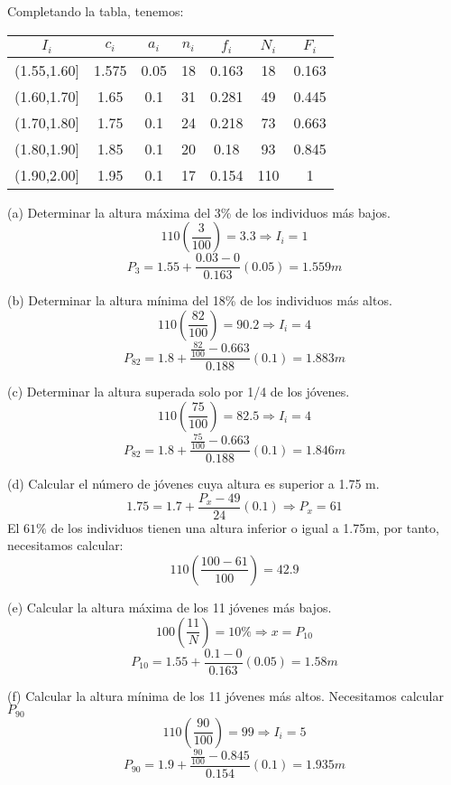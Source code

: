 \documentclass[a4paper,12pt]{article}
\begin{document}
Completando la tabla, tenemos:
\begin{center}
    \begin{tabular}{c|c|c|c|c|c|c}
        $I_i$ & $c_i$ & $a_i$ & $n_i$ & $f_i$ & $N_i$ & $F_i$\\
        \hline
        (1.55,1.60] & 1.575 & 0.05 & 18 & 0.163 & 18 & 0.163 \\
        (1.60,1.70] & 1.65 & 0.1 & 31 & 0.281 & 49 & 0.445\\
        (1.70,1.80] & 1.75 & 0.1 & 24 & 0.218 & 73 & 0.663\\
        (1.80,1.90] & 1.85 & 0.1 & 20 & 0.18 & 93 & 0.845\\
        (1.90,2.00] & 1.95 & 0.1 & 17 & 0.154 & 110 & 1\\
    \end{tabular}
\end{center}

(a) Determinar la altura máxima del 3\% de los individuos más bajos.\\
    $$110(\frac{3}{100})=3.3 \Rightarrow I_i=1$$
    $$P_3 = 1.55 + \frac {0.03 - 0}{0.163}(0.05) = 1.559m$$
    
(b) Determinar la altura mínima del 18\% de los individuos más altos.\\
    $$110(\frac{82}{100})=90.2 \Rightarrow I_i=4$$
    $$P_{82}= 1.8 + \frac{\frac{82}{100} - 0.663}{0.188} (0.1) = 1.883m$$
    
(c) Determinar la altura superada solo por 1/4 de los jóvenes.\\
    $$110(\frac{75}{100})=82.5 \Rightarrow I_i=4$$
    $$P_{82}= 1.8 + \frac{\frac{75}{100} - 0.663}{0.188} (0.1) = 1.846m$$

(d) Calcular el número de jóvenes cuya altura es superior a 1.75 m.\\
    $$1.75 = 1.7 + \frac{P_x - 49}{24}(0.1) \Rightarrow P_x = 61 $$
    El $61\%$ de los individuos tienen una altura inferior o igual a 1.75m, por tanto, necesitamos calcular:
    $$110(\frac{100-61}{100}) = 42.9$$

(e) Calcular la altura máxima de los 11 jóvenes más bajos.\\
 $$100(\frac{11}{N}) = 10\% \Rightarrow x= P_{10}$$
 $$P_{10} = 1.55 + \frac {0.1 - 0}{0.163}(0.05) = 1.58m$$
    
(f) Calcular la altura mínima de los 11 jóvenes más altos.
Necesitamos calcular $P_{90}$
$$110(\frac{90}{100})=99 \Rightarrow I_i=5$$
$$P_{90}= 1.9 + \frac{\frac{90}{100} - 0.845}{0.154} (0.1) = 1.935m$$
\end{document}
